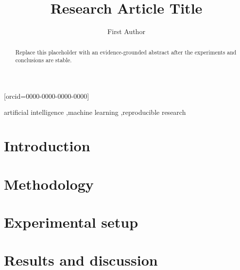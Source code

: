 \documentclass[a4paper,fleqn]{cas-sc}
\begin{document}

\title[mode=title]{Research Article Title}

\author[1]{First Author}[orcid=0000-0000-0000-0000]
\address[1]{organization={Institution Name},
             city={City},
             country={Country}}

\begin{abstract}
Replace this placeholder with an evidence-grounded abstract after the experiments and conclusions are stable.
\end{abstract}

\begin{keywords}
artificial intelligence \sep machine learning \sep reproducible research
\end{keywords}

\maketitle

\section{Introduction}
\label{sec:introduction}


\section{Methodology}
\label{sec:methods}


\section{Experimental setup}
\label{sec:experimental-setup}


\section{Results and discussion}
\label{sec:results-discussion}
\end{document}
